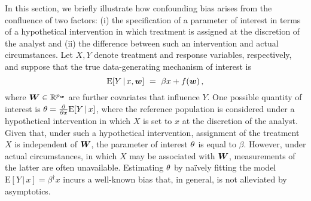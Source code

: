 \documentclass{uwstat572}
\newcommand{\be}{\begin{equation}}
\newcommand{\ee}{\end{equation}}
\newcommand{\benn}{\begin{equation*}}
\newcommand{\eenn}{\end{equation*}}
\newcommand{\R}{\ensuremath{\mathbb{R}}}
\newcommand{\gb}{\beta}
\newcommand{\gep}{\epsilon}
\newcommand{\pdd}[2]{\frac{\partial #1}{\partial #2}}
\newcommand{\E}{\mathrm{E}}
\newcommand{\bias}{\mathrm{bias}}
\numberwithin{equation}{section}
\begin{document}
In this section, we briefly illustrate how confounding bias arises from the confluence of two factors: (i) the specification of a parameter of interest in terms of a hypothetical intervention in which treatment is assigned at the discretion of the analyst and (ii) the difference between such an intervention and actual circumstances. Let $X, Y$ denote treatment and response variables, respectively, and suppose that the true data-generating mechanism of interest is
\be\label{eq:conf1}
	\E[Y\,|\,x, \w] \ = \ \gb x + f(\w) \,, %
\ee
where $\W\in\R^\pw$ are further covariates that influence $Y$. One possible quantity of interest is $\eft = \pdd{}{x}\E[Y\,|\,x]$, where the reference population is considered under a hypothetical intervention in which $X$ is set to $x$ at the discretion of the analyst. Given that, under such a hypothetical intervention, assignment of the treatment $X$ is independent of $\boldsymbol{W}$, the parameter of interest $\theta$ is equal to $\gb$. However, under actual circumstances, in which $X$ may be associated with $\boldsymbol{W}$, measurements of the latter are often unavailable. Estimating $\theta$ by na\"ively fitting the model $\E[Y\,|\,x] = \gb^\dagger x$ incurs a well-known bias that, in general, is not alleviated by asymptotics.

 
\end{document}

